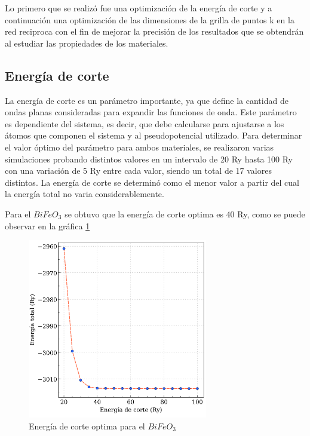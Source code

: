 Lo primero que se realiz\'o fue una optimizaci\'on de la energ\'ia de corte y a 
continuaci\'on una optimizaci\'on de las dimensiones de la grilla de puntos k 
en la red reciproca con el fin de 
mejorar la precisi\'on de los resultados que se obtendr\'an al estudiar las 
propiedades de los materiales.

\subsection{Energ\'ia de corte}

La energ\'ia de corte es un par\'ametro importante, ya que define la 
cantidad de ondas planas consideradas para expandir las funciones de 
onda. Este par\'ametro es dependiente del sistema, es decir, que debe 
calcularse para ajustarse a los \'atomos que componen el sistema y al 
pseudopotencial utilizado. Para determinar el valor \'optimo del par\'ametro 
para 
ambos materiales, se realizaron varias simulaciones probando distintos valores 
en un intervalo de 20 Ry hasta 100 Ry con una variaci\'on de 5 Ry entre cada 
valor, siendo un total de 17 valores distintos. La energ\'ia de corte se 
determin\'o como el menor valor a partir del cual la energ\'ia total no varia 
considerablemente. 

\noindent Para el $BiFeO_{3}$ se obtuvo que la energ\'ia de corte optima es 40 
Ry, como 
se puede observar en la gr\'afica \ref{energia_corte_BFO}

\begin{figure}[H]
    \centering
    \includegraphics[width=0.7\textwidth]{contenido/resultados/optimizacion/img_optimizacion/energia_corte_BFO.png}
    \caption[Energ\'ia de corte $BiFeO_{3}$]{Energ\'ia de corte optima 
        para el $BiFeO_{3}$}
    \label{energia_corte_BFO}
\end{figure}

